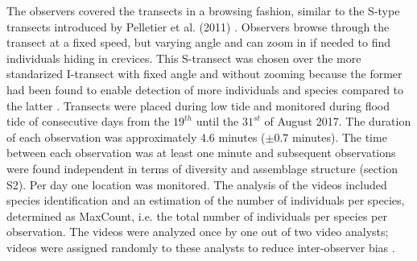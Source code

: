 The observers covered the transects in a browsing fashion, similar to the S-type transects introduced by Pelletier et al. (2011) \citep{Pelletier2011}. Observers browse through the transect at a fixed speed, but varying angle and can zoom in if needed to find individuals hiding in crevices. This S-transect was chosen over the more standarized I-transect with fixed angle and without zooming because the former had been found to enable detection of more individuals and species compared to the latter \citep{Pelletier2011}. Transects were placed during low tide and monitored during flood tide of consecutive days from the $19^{th}$ until the $31^{st}$ of August 2017. The duration of each observation was approximately 4.6 minutes ($\pm 0.7$ minutes). The time between each observation was at least one minute and subsequent observations were found independent in terms of diversity and assemblage structure (section S2). Per day one location was monitored. The analysis of the videos included species identification and an estimation of the number of individuals per species, determined as MaxCount, i.e. the total number of individuals per species per observation. The videos were analyzed once by one out of two video analysts; videos were assigned randomly to these analysts to reduce inter-observer bias \citep{Williams2006ImpactSurveys}. 


